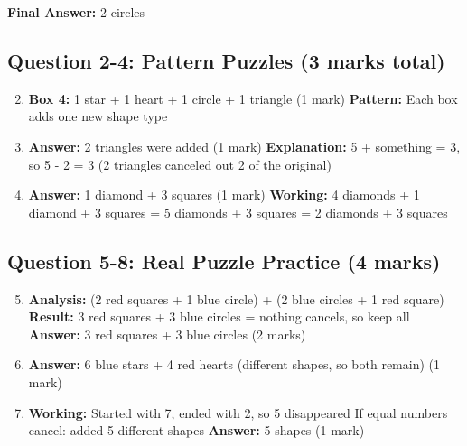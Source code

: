 \documentclass{article}
\begin{document}
\textbf{Final Answer:} 2 circles

\subsection*{Question 2-4: Pattern Puzzles (3 marks total)}
\begin{enumerate}
    \setcounter{enumi}{1}
    \item \textbf{Box 4:} 1 star + 1 heart + 1 circle + 1 triangle (1 mark)
          \textbf{Pattern:} Each box adds one new shape type
    
    \item \textbf{Answer:} 2 triangles were added (1 mark)
          \textbf{Explanation:} 5 + something = 3, so 5 - 2 = 3 (2 triangles canceled out 2 of the original)
    
    \item \textbf{Answer:} 1 diamond + 3 squares (1 mark)
          \textbf{Working:} 4 diamonds + 1 diamond + 3 squares = 5 diamonds + 3 squares = 2 diamonds + 3 squares
\end{enumerate}

\subsection*{Question 5-8: Real Puzzle Practice (4 marks)}
\begin{enumerate}
    \setcounter{enumi}{4}
    \item \textbf{Analysis:} (2 red squares + 1 blue circle) + (2 blue circles + 1 red square)
          \textbf{Result:} 3 red squares + 3 blue circles = nothing cancels, so keep all
          \textbf{Answer:} 3 red squares + 3 blue circles (2 marks)
    
    \item \textbf{Answer:} 6 blue stars + 4 red hearts (different shapes, so both remain) (1 mark)
    
    \item \textbf{Working:} Started with 7, ended with 2, so 5 disappeared
          If equal numbers cancel: added 5 different shapes
          \textbf{Answer:} 5 shapes (1 mark)
\end{enumerate}
\end{document}
